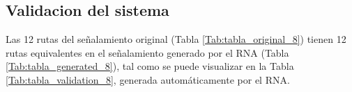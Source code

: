 \subsection{Validacion del sistema}

    Las 12 rutas del señalamiento original (Tabla \ref{Tab:tabla_original_8}) tienen 12 rutas equivalentes en el señalamiento generado por el RNA (Tabla \ref{Tab:tabla_generated_8}), tal como se puede visualizar en la Tabla \ref{Tab:tabla_validation_8}, generada automáticamente por el RNA.

    \begin{table}[H]
        {
        \caption{Equivalencias entre las rutas originales y las generadas por el RNA.}
        \label{Tab:tabla_validation_8}
        \centering
            \begin{center}
            \end{center}
        }    
    \end{table}
    
